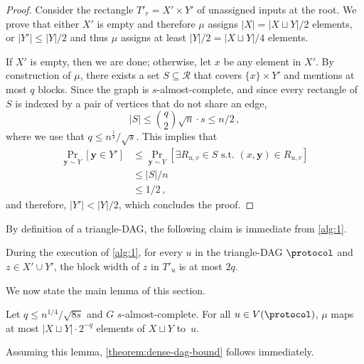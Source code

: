 \documentclass[10pt,a4paper]{article}
\theoremstyle{definition}
\theoremstyle{remark}
\theoremstyle{example}
\theoremstyle{plain}
\newcommand{\threshold}{q}
\newcommand{\random}[1]{\bm{#1}}
\newcommand{\ndense}{almost-complete\xspace}
\begin{document}
{}{
\begin{proof}
Consider the rectangle $T'_r = X'\times Y'$ of unassigned inputs at the root. 
We prove that either $X'$ is empty and therefore $\mu$ assigns $\lvert X\rvert = \lvert X\sqcup Y\rvert /2$ elements, or $\lvert Y' \rvert \le \lvert Y\rvert/2$ and thus $\mu$ assigns at least $\lvert Y\rvert/2 = \lvert X\sqcup Y\rvert /4$ elements.

If $X'$ is empty, then we are done; otherwise, let $x$ be any element in $X'$. By construction of $\mu$,  there exists a set $S\subseteq \mathcal{R}$ that covers $\{x\}\times Y'$ and mentions at most $\threshold$ blocks. Since the graph is $s$-\ndense, and since every rectangle of $S$ is indexed by a pair of vertices that do not share an edge, 
\begin{equation}
\lvert S\rvert \leq 
\binom{\threshold}{2} 
\sqrt{n}
\cdot
s \leq 
n/2 \,,
\end{equation}
where we use that $q \leq n^{\frac{1}{4}}/\sqrt{s}$.
This implies that
\begin{align*}
    \Pr_{\random{y}\sim Y}\left[\random{y}\in Y'\right] 
    &\leq \Pr_{\random{y}\sim Y}\left[\exists R_{u,v}\in S\text{ s.t. } (x,\random{y})\in R_{u,v}\right]\\
    &\leq \lvert S\rvert /n \\
    &\leq 1/2\,,
\end{align*}
and therefore, $\lvert Y'\rvert  < \lvert Y\rvert /2$, which concludes the proof.
\end{proof}
}

By definition of a triangle-DAG, the following claim is immediate from  \autoref{alg:1}. 
\begin{claim}
    During the execution of \autoref{alg:1}, for every $u$ in the triangle-DAG $\protocol$ and $z\in X'\cup Y'$, the block width of $z$ in $T'_u$ is at most $2\threshold$.
\end{claim}

We now state the main lemma of this section.
\begin{lemma}
    \label{lemma:few x are assigned per node}
    Let $\threshold\leq n^{1/4}/\sqrt{8s}$ and $G$ $s$-\ndense. For all $u\in V(\protocol)$, $\mu$ maps at most $\lvert X \sqcup Y\rvert \cdot 2^{-\threshold}$ elements of $X\sqcup Y$ to~$u$. 
\end{lemma}

Assuming this lemma, \autoref{theorem:dense-dag-bound} follows immediately.
\end{document}
